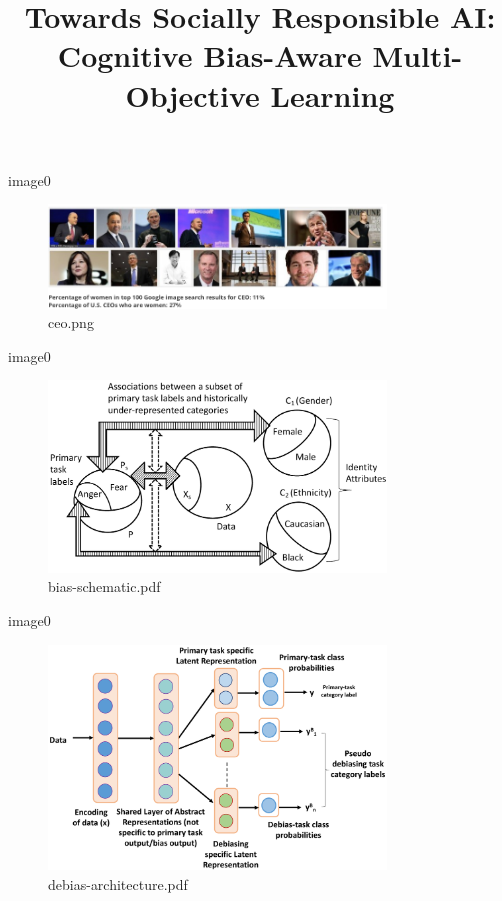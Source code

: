 \documentclass{beamer}%
\title{Towards Socially Responsible AI: Cognitive Bias{-}Aware Multi{-}Objective Learning\newline%
}%
\begin{document}
%
\normalsize%
\maketitle%
image0%


\begin{figure}%
\centering%
\includegraphics[width=0.8\textwidth]{ceo.png}%
\caption{ceo.png}%
\end{figure}

%
image0%


\begin{figure}%
\centering%
\includegraphics[width=0.8\textwidth]{bias-schematic.pdf}%
\caption{bias{-}schematic.pdf}%
\end{figure}

%
image0%


\begin{figure}%
\centering%
\includegraphics[width=0.8\textwidth]{debias-architecture.pdf}%
\caption{debias{-}architecture.pdf}%
\end{figure}
\end{document}
